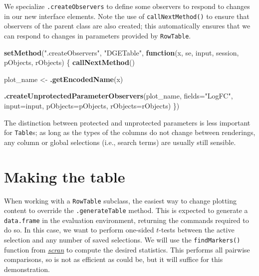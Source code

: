 \documentclass[]{book}
\newenvironment{Shaded}{\begin{snugshade}}{\end{snugshade}}
\newcommand{\KeywordTok}[1]{\textcolor[rgb]{0.13,0.29,0.53}{\textbf{#1}}}
\newcommand{\DataTypeTok}[1]{\textcolor[rgb]{0.13,0.29,0.53}{#1}}
\newcommand{\StringTok}[1]{\textcolor[rgb]{0.31,0.60,0.02}{#1}}
\newcommand{\ControlFlowTok}[1]{\textcolor[rgb]{0.13,0.29,0.53}{\textbf{#1}}}
\newcommand{\NormalTok}[1]{#1}
\begin{document}
We specialize \texttt{.createObservers} to define some observers to
respond to changes in our new interface elements. Note the use of
\texttt{callNextMethod()} to ensure that observers of the parent class
are also created; this automatically ensures that we can respond to
changes in parameters provided by \texttt{RowTable}.

\begin{Shaded}
\begin{Highlighting}[]
\KeywordTok{setMethod}\NormalTok{(}\StringTok{".createObservers"}\NormalTok{, }\StringTok{"DGETable"}\NormalTok{, }
    \ControlFlowTok{function}\NormalTok{(x, se, input, session, pObjects, rObjects) }
\NormalTok{\{}
    \KeywordTok{callNextMethod}\NormalTok{()}

\NormalTok{    plot_name <-}\StringTok{ }\KeywordTok{.getEncodedName}\NormalTok{(x)}

    \KeywordTok{.createUnprotectedParameterObservers}\NormalTok{(plot_name,}
        \DataTypeTok{fields=}\StringTok{"LogFC"}\NormalTok{,}
        \DataTypeTok{input=}\NormalTok{input, }\DataTypeTok{pObjects=}\NormalTok{pObjects, }\DataTypeTok{rObjects=}\NormalTok{rObjects)}
\NormalTok{\})}
\end{Highlighting}
\end{Shaded}

The distinction between protected and unprotected parameters is less
important for \texttt{Table}s; as long as the types of the columns do
not change between renderings, any column or global selections (i.e.,
search terms) are usually still sensible.

\section{Making the table}\label{making-the-table}

When working with a \texttt{RowTable} subclass, the easiest way to
change plotting content to override the \texttt{.generateTable} method.
This is expected to generate a \texttt{data.frame} in the evaluation
environment, returning the commands required to do so. In this case, we
want to perform one-sided \(t\)-tests between the active selection and
any number of saved selections. We will use the \texttt{findMarkers()}
function from
\emph{\href{https://bioconductor.org/packages/3.11/scran}{scran}} to
compute the desired statistics. This performs all pairwise comparisons,
so is not as efficient as could be, but it will suffice for this
demonstration.
\end{document}
